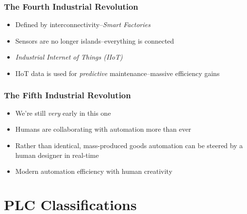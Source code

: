 \begin{frame}
    \frametitle{The Fourth Industrial Revolution}

    \begin{itemize}
        \item[2011] Defined by interconnectivity--\emph{Smart Factories}
        \item Sensors are no longer islands--everything is connected
        \item \emph{Industrial Internet of Things (IIoT)}
        \item IIoT data is used for \emph{predictive} maintenance--massive efficiency gains
    \end{itemize}
\end{frame}

\begin{frame}
    \frametitle{The Fifth Industrial Revolution}

    \begin{itemize}
        \item We're still \emph{very} early in this one
        \item Humans are collaborating with automation more than ever
        \item Rather than identical, mass-produced goods automation can be steered by a human designer in real-time
        \item Modern automation efficiency with human creativity
    \end{itemize}
\end{frame}

\section{PLC Classifications}

